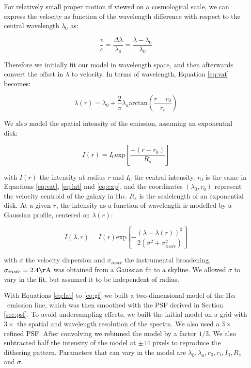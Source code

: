 \documentclass{emulateapj}
\newcommand{\ha}{H$\alpha$}
\begin{document}
For relatively small proper motion if viewed on a cosmological scale, we can express the velocity as function of the wavelength difference with respect to the central wavelength $\lambda_0$ as:

\begin{equation}
\frac{v}{c}=\frac{\Delta\lambda}{\lambda_0}=\frac{\lambda-\lambda_0}{\lambda_0}
\label{eq:lv}
\end{equation}

Therefore we initially fit our model in wavelength space, and then afterwards convert the offset in $\lambda$ to velocity. In terms of wavelength, Equation \ref{eq:vat} becomes:

\begin{equation}
\lambda(r)=\lambda_0+\frac{2}{\pi}\lambda_a \mathrm{arctan}\left(\frac{r-r_0}{r_t}\right)
\label{eq:lat}
\end{equation}

We also model the spatial intensity of the emission, assuming an exponential disk:

\begin{equation}
I(r)=I_0\mathrm{exp}\left[\frac{-(r-r_0)}{R_s}\right]
\label{eq:exp}
\end{equation}

with $I(r)$ the intensity at radius $r$ and $I_0$ the central intensity. $r_0$ is the same in Equations \ref{eq:vat}, \ref{eq:lat} and \ref{eq:exp}, and the coordinates $(\lambda_0,r_0)$ represent the velocity centroid of the galaxy in \ha. $R_s$ is the scalelength of an exponential disk. At a given $r$, the intensity as a function of wavelength is modelled by a Gaussian profile, centered on $\lambda(r)$:

\begin{equation}
I(\lambda,r)=I(r)\mathrm{exp}\left[-\frac{(\lambda-\lambda(r))^2}{2(\sigma^2+\sigma_{instr}^2)}\right]
\label{eq:gf}
\end{equation}

with $\sigma$ the velocity dispersion and $\sigma_{instr}$ the instrumental broadening. $\sigma_{instr}=2.4\mathrm{\AA}$ was obtained from a Gaussian fit to a skyline. We allowed $\sigma$ to vary in the fit, but assumed it to be independent of radius. 

With Equations \ref{eq:lat} to \ref{eq:gf} we built a two-dimensional model of the \ha\ emission line, which was then smoothed with the PSF derived in Section \ref{sec:psf}. To avoid undersampling effects, we built the initial model on a grid with $3\times$ the spatial and wavelength resolution of the spectra. We also used a $3\times$ refined PSF. After convolving we rebinned the model by a factor $1/3$. We also subtracted half the intensity of the model at $\pm 14$ pixels to reproduce the dithering pattern. Parameters that can vary in the model are $\lambda_0,\lambda_a,r_0,r_t,I_0,R_s$ and $\sigma$. 
\end{document}
